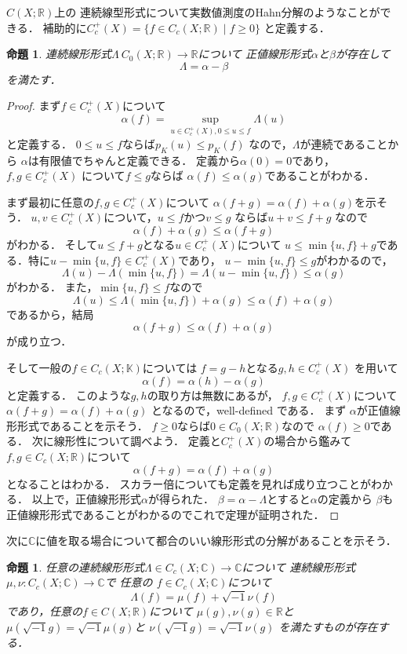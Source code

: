 \documentclass[leqno]{jsarticle}
\newtheorem{prop}[thm]{命題}
\newcommand{\rr}{\mathbb{R}}
\newcommand{\cc}{\mathbb{C}}
\newcommand{\kk}{\mathbb{K}}
\begin{document}
$C(X; \rr)$上の
連続線型形式について実数値測度のHahn分解のようなことができる．
補助的に$C_c^+(X)=\{f\in C_c(X; \rr)\mid f\ge 0\}$
と定義する．
\begin{prop}\label{daiji}
連続線形形式$\Lambda\: C_0(X; \rr)\to \rr$について
正値線形形式$\alpha$と$\beta$が存在して
\[
\Lambda=\alpha-\beta
\]
を満たす．
\end{prop}
\begin{proof}
まず$f\in C_c^+(X)$について
\[
\alpha(f)=\sup_{u\in C_c^+(X), 0\le u\le f}\Lambda(u)
\]
と定義する．
$0\le u\le f$ならば$p_K(u)\le p_K(f)$
なので，$\Lambda$が連続であることから
$\alpha$は有限値でちゃんと定義できる．
定義から$\alpha(0)=0$であり，
$f, g\in C_c^+(X)$
について$f\le g$ならば
$\alpha(f)\le \alpha(g)$であることがわかる．

まず最初に任意の$f, g\in C_c^+(X)$について
$\alpha(f+g)=\alpha(f)+\alpha(g)$を示そう．
$u, v\in C_c^+(X)$について，$u\le f$かつ$v\le g$
ならば$u+v\le f+g$
なので
\[
\alpha(f)+\alpha(g)\le \alpha(f+g)
\]
がわかる．
そして$u\le f+g$となる$u\in C_c^+(X)$について
$u\le \min\{u, f\}+g$である．特に$u-\min\{u, f\}\in C_c^+(X)$であり，
$u-\min\{u, f\}\le g$がわかるので，
\[
\Lambda(u)-\Lambda(\min\{u, f\})=\Lambda(u-\min\{u, f\})\le \alpha(g)
\]
がわかる．
また，$\min\{u, f\}\le f$なので
\[
\Lambda(u)\le \Lambda(\min\{u, f\})+\alpha(g)\le \alpha(f)+\alpha(g)
\]
であるから，結局
\[
\alpha(f+g)\le \alpha(f)+\alpha(g)
\]
が成り立つ．

そして一般の$f\in C_c(X; \kk)$については
$f=g-h$となる$g, h\in C_c^+(X)$
を用いて
\[
\alpha(f)=\alpha(h)-\alpha(g)
\]
と定義する．
このような$g, h$の取り方は無数にあるが，
$f, g\in C_c^+(X)$について
$\alpha(f+g)=\alpha(f)+\alpha(g)$
となるので，well-defined である．
まず
$\alpha$が正値線形形式であることを示そう．
$f\ge 0$ならば$0\in C_0(X; \rr)$なので
$\alpha(f)\ge 0$である．
次に線形性について調べよう．
定義と$C_c^+(X)$の場合から鑑みて
$f, g\in C_c(X; \rr)$について
\[
\alpha(f+g)=\alpha(f)+\alpha(g)
\]
となることはわかる．
スカラー倍についても定義を見れば成り立つことがわかる．
以上で，正値線形形式$\alpha$が得られた．
$\beta=\alpha-\Lambda$とすると$\alpha$の定義から
$\beta$も正値線形形式であることがわかるのでこれで定理が証明された．
\end{proof}
次に$\cc$に値を取る場合について都合のいい線形形式の分解があることを示そう．
\begin{prop}
任意の連続線形形式$\Lambda\in C_c(X; \cc)\to \cc$について
連続線形形式$\mu, \nu: C_c(X; \cc)\to \cc$で
任意の $f\in C_c(X; \cc)$について
\[
\Lambda(f)=\mu(f)+\sqrt{-1}\nu(f)
\]
であり，任意の$f\in C(X; \rr)$について
$\mu(g), \nu(g)\in \rr$と
$\mu(\sqrt{-1}g)=\sqrt{-1}\mu(g)$と
$\nu(\sqrt{-1}g)=\sqrt{-1}\nu(g)$
を満たすものが存在する．
\end{prop}
\end{document}
